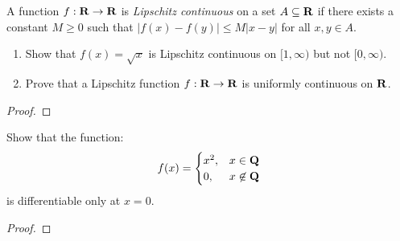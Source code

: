 \documentclass[11pt,twoside,openany]{memoir}
\begin{document}
\newpage
\fancyhead[L]{\scalebox{0.9}{Derivatives and the Mean Value Theorem}}
\fancyhead[R]{\scalebox{0.9}{Appeared on: S15}}
\begin{problem}
    A function $f:\mathbf{R} \rightarrow \mathbf{R}$ is \textit{Lipschitz continuous} on a set $A \subseteq \mathbf{R}$ if there exists a constant $M \geq 0$ such that $|f(x) - f(y)| \leq M|x-y|$ for all $x,y \in A$.
    \begin{enumerate}[label = (\arabic*)]
        \item Show that $f(x) = \sqrt{x}$ is Lipschitz continuous on $[1,\infty)$ but not $[0,\infty)$.
        \item Prove that a Lipschitz function $f:\mathbf{R} \rightarrow \mathbf{R}$ is uniformly continuous on $\mathbf{R}$.
    \end{enumerate}
\end{problem}
\begin{proof}
\end{proof}

\newpage
\fancyhead[L]{\scalebox{0.9}{Derivatives and the Mean Value Theorem}}
\fancyhead[R]{\scalebox{0.9}{Appeared on: S20}}
\begin{problem}
    Show that the function:
        \begin{equation*}
        \begin{split}
            f(x) = 
            \begin{cases}
                x^2, & x \in \mathbf{Q} \\
                0, & x \not\in \mathbf{Q}
            \end{cases}
        \end{split}
        \end{equation*}
    is differentiable only at $x = 0$.
\end{problem}
\begin{proof}
\end{proof}
\end{document}
